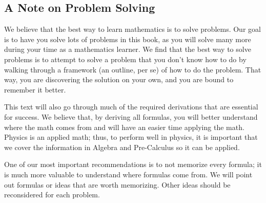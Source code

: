 \documentclass[../book.tex]{subfiles}
\begin{document}
\subsection{A Note on Problem Solving}
We believe that the best way to learn mathematics is to solve problems.  Our goal is to have you solve lots of problems in this book, as you will solve many more during your time as a mathematics learner.  We find that the best way to solve problems is to attempt to solve a problem that you don't know how to do by walking through a framework (an outline, per se) of how to do the problem.  That way, you are discovering the solution on your own, and you are bound to remember it better.

This text will also go through much of the required derivations that are essential for success.  We believe that, by deriving all formulas, you will better understand where the math comes from and will have an easier time applying the math.  Physics is an applied math; thus, to perform well in physics, it is important that we cover the information in Algebra and Pre-Calculus so it can be applied.

One of our most important recommendations is to not memorize every formula; it is much more valuable to understand where formulas come from.  We will point out formulas or ideas that are worth memorizing.  Other ideas should be reconsidered for each problem.
\end{document}
